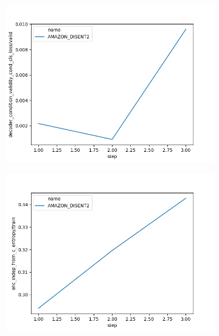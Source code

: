 \begin{figure}[h]
\begin{subfigure}{0.3\textheight}
        \centering
        \includegraphics[width=1.\textwidth]{images/figs2/2020_01_15__12_10_34__decoder_condition_validity_cond_cls_loss.png}
        \caption{}
        \label{fig:chap4:amazon_disent_xcls}
    \end{subfigure}
    \begin{subfigure}{0.3\textheight}
        \centering
        \includegraphics[width=1.\textwidth]{images/figs2/2020_01_15__11_44_04__enc_indep_from_c_entropy.png}
        \caption{}
        \label{fig:chap4:amazon_disent_indp}
    \end{subfigure}
    \begin{subfigure}{0.3\textheight}
        \centering

\end{subfigure}
\end{figure}
